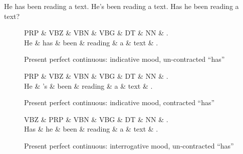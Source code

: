\begin{exe}
	\ex\label{ex:ppc1} He has been reading a text.
	\ex\label{ex:ppc2} He's been reading a text.
	\ex\label{ex:ppc3} Has he been reading a text?
\end{exe}

\begin{figure}[H]
	\centering
	\begin{minipage}[b]{0.45\textwidth}
		\centering
		\begin{dependency}
			\begin{deptext}[]
				PRP \& VBZ \& VBN \& VBG \& DT \& NN \& . \\
				He \& has \& been \& reading \& a \& text \& . \\
			\end{deptext}
		\end{dependency}
		\caption{Present perfect continuous: indicative mood, un-contracted ``has''}
		\label{fig:ppc1}
	\end{minipage}
	\quad
	\begin{minipage}[b]{0.45\textwidth}
		\begin{dependency}
			\begin{deptext}[]
				PRP \& VBZ \& VBN \& VBG \& DT \& NN \& . \\
				He \& 's \& been \& reading \& a \& text \& . \\
			\end{deptext}
		\end{dependency}
		\caption{Present perfect continuous: indicative mood, contracted ``has'' }
		\label{fig:ppc2}
	\end{minipage}
\end{figure}
%
\begin{figure}[H]
	\centering
	\begin{dependency}
		\begin{deptext}[]
			VBZ \& PRP \& VBN \& VBG \& DT \& NN \& . \\
			Has \& he \& been \& reading \& a \& text \& . \\
		\end{deptext}
	\end{dependency}
	\caption{Present perfect continuous: interrogative mood, un-contracted ``has''}
	\label{fig:ppc3}
\end{figure}

